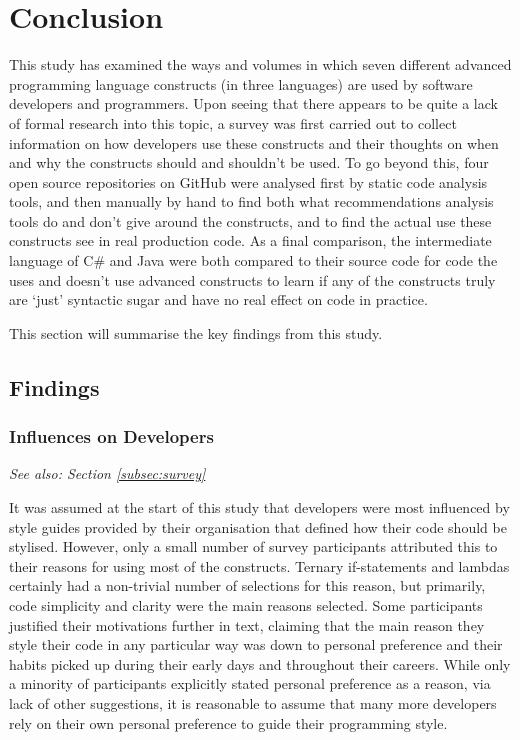 \documentclass{article}
\begin{document}
\section{Conclusion}
\label{sec:conclusion}
    This study has examined the ways and volumes in which seven different advanced programming language constructs (in three languages) are used by software developers and programmers. Upon seeing that there appears to be quite a lack of formal research into this topic, a survey was first carried out to collect information on how developers use these constructs and their thoughts on when and why the constructs should and shouldn't be used. To go beyond this, four open source repositories on GitHub were analysed first by static code analysis tools, and then manually by hand to find both what recommendations analysis tools do and don't give around the constructs, and to find the actual use these constructs see in real production code. As a final comparison, the intermediate language of C\# and Java were both compared to their source code for code the uses and doesn't use advanced constructs to learn if any of the constructs truly are `just' syntactic sugar and have no real effect on code in practice.
    
    This section will summarise the key findings from this study.
    \subsection{Findings}
        \subsubsection{Influences on Developers}
            \textit{See also: Section \ref{subsec:survey}}
            \newline

            \noindent It was assumed at the start of this study that developers were most influenced by style guides provided by their organisation that defined how their code should be stylised. However, only a small number of survey participants attributed this to their reasons for using most of the constructs. Ternary if-statements and lambdas certainly had a non-trivial number of selections for this reason, but primarily, code simplicity and clarity were the main reasons selected. Some participants justified their motivations further in text, claiming that the main reason they style their code in any particular way was down to personal preference and their habits picked up during their early days and throughout their careers. While only a minority of participants explicitly stated personal preference as a reason, via lack of other suggestions, it is reasonable to assume that many more developers rely on their own personal preference to guide their programming style.
\end{document}
